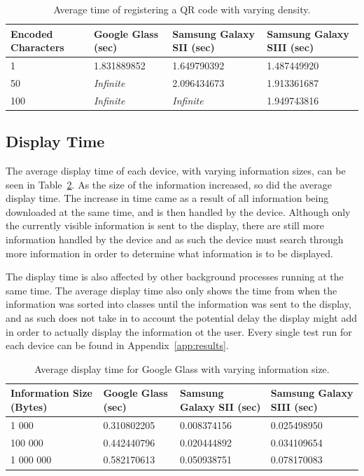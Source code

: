 	\begin{table}[H]%
    		\caption{Average time of registering a QR code with varying density.} \label{tab:complexityAverage}
		\centering \begin{tabularx}{\textwidth}{l|X|X|X} \hline
		\textbf{Encoded Characters} & \textbf{Google Glass (sec)} & \textbf{Samsung Galaxy SII (sec)} & \textbf{Samsung Galaxy SIII (sec)} \\ \hline \hline
       
		1	&1.831889852	&1.649790392	&1.487449920	\\ \hline
		50	&\textit{Infinite}	&2.096434673	&1.913361687	\\ \hline
		100	&\textit{Infinite}	&\textit{Infinite}	&1.949743816	\\ \hline
		
		\end{tabularx}
	\end{table}

\subsection{Display Time}

The average display time of each device, with varying information sizes, can be seen in Table~\ref{tab:averageDisplaySpeedGoogleGlass}. As the size of the information increased, so did the average display time. The increase in time came as a result of all information being downloaded at the same time, and is then handled by the device. Although only the currently visible information is sent to the display, there are still more information handled by the device and as such the device must search through more information in order to determine what information is to be displayed. 

The display time is also affected by other background processes running at the same time. The average display time also only shows the time from when the information was sorted into classes until the information was sent to the display, and as such does not take in to account the potential delay the display might add in order to actually display the information ot the user. Every single test run for each device can be found in Appendix~\ref{app:results}.

	\begin{table}[ht!]
    		\caption{Average display time for Google Glass with varying information size.} \label{tab:averageDisplaySpeedGoogleGlass}
		\centering \begin{tabularx}{\textwidth}{l|X|X|X} \hline
		\textbf{Information Size (Bytes)} & \textbf{Google Glass (sec)}  & \textbf{Samsung Galaxy SII (sec)}  & \textbf{Samsung Galaxy SIII (sec)} \\ \hline \hline
       
		1 000	&0.310802205	&0.008374156	&0.025498950	 \\ \hline
		100 000 	&0.442440796	&0.020444892	&0.034109654	 \\ \hline
		1 000 000	&0.582170613	&0.050938751	&0.078170083	 \\ \hline

		\end{tabularx}
	\end{table}


